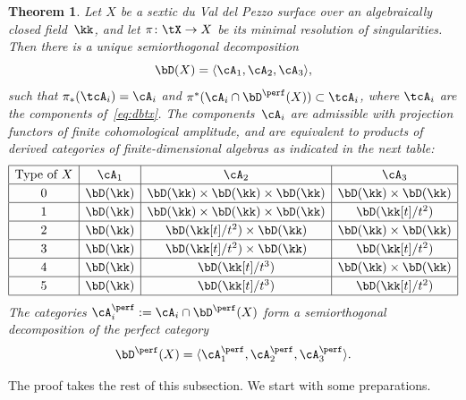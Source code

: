\documentclass[11pt]{amsart}
\theoremstyle{plain}
\newtheorem{theorem}{Theorem}[section]
\theoremstyle{definition}
\theoremstyle{remark}
\begin{document}
\begin{theorem}
\label{theorem:dbx}
Let $X$ be a sextic du Val del Pezzo surface over an algebraically closed field~$\kk$, and let $\pi \colon \tX \to X$ be its minimal resolution of singularities.
Then there is a unique semiorthogonal decomposition
\begin{equation}\label{eq:dbx}
\bD(X) = \langle \cA_1, \cA_2, \cA_3 \rangle,
\end{equation}
such that $\pi_*(\tcA_i) = \cA_i$ and $\pi^*(\cA_i \cap \bD^\perf(X)) \subset \tcA_i$, where $\tcA_i$ are the components of~\eqref{eq:dbtx}.
The components~$\cA_i$ are admissible with projection functors of finite cohomological amplitude, 
and are equivalent to products of derived categories of finite-dimensional algebras as indicated 
in the next table:
\begin{equation*}\def\arraystretch{1.2}%
\begin{array}{|c|c|c|c|}
\hline
\text{Type of $X$} & \cA_1 & \cA_2 & \cA_3 \\
\hline 
0 & \bD(\kk) & \bD(\kk) \times \bD(\kk) \times \bD(\kk) & \bD(\kk) \times \bD(\kk) \\
\hline
1 & \bD(\kk) & \bD(\kk) \times \bD(\kk) \times \bD(\kk) & \bD(\kk[t]/t^2) \\
\hline
2 & \bD(\kk) & \bD(\kk[t]/t^2) \times \bD(\kk) & \bD(\kk)  \times \bD(\kk) \\
\hline
3 & \bD(\kk) & \bD(\kk[t]/t^2) \times \bD(\kk) & \bD(\kk[t]/t^2) \\
\hline
4 & \bD(\kk) & \bD(\kk[t]/t^3) & \bD(\kk)  \times \bD(\kk) \\
\hline
5 & \bD(\kk) & \bD(\kk[t]/t^3) & \bD(\kk[t]/t^2) \\
\hline
\end{array}
\end{equation*}
The categories $\cA_i^\perf := \cA_i \cap \bD^\perf(X)$ form a semiorthogonal decomposition of the perfect category
\begin{equation*}
\bD^\perf(X) = \langle \cA_1^\perf, \cA_2^\perf, \cA_3^\perf \rangle.
\end{equation*}
\end{theorem}

The proof takes the rest of this subsection.
We start with some preparations.
\end{document}
